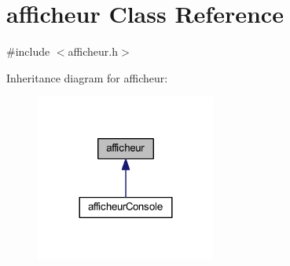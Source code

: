 \hypertarget{classafficheur}{}\section{afficheur Class Reference}
\label{classafficheur}


{\ttfamily \#include $<$afficheur.\+h$>$}



Inheritance diagram for afficheur\+:\nopagebreak
\begin{figure}[H]
\begin{center}
\leavevmode
\includegraphics[width=168pt]{classafficheur__inherit__graph}
\end{center}
\end{figure}
